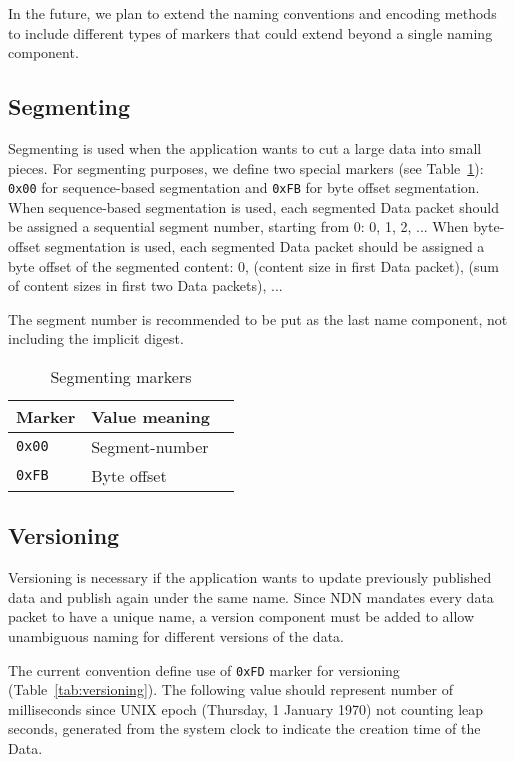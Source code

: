 In the future, we plan to extend the naming conventions and encoding methods to include different types of markers that could extend beyond a single naming component.

\subsection{Segmenting}
\label{sec:segmenting}

Segmenting is used when the application wants to cut a large data into small pieces.
For segmenting purposes, we define two special markers (see Table~\ref{tab:segmenting}): \verb|0x00| for sequence-based segmentation and \verb|0xFB| for byte offset segmentation.
When sequence-based segmentation is used, each segmented Data packet should be assigned a sequential segment number, starting from 0: 0, 1, 2, ...
When byte-offset segmentation is used, each segmented Data packet should be assigned a byte offset of the segmented content: 0, (content size in first Data packet), (sum of content sizes in first two Data packets), ...

The segment number is recommended to be put as the last name component, not including the implicit digest.

\begin{table}[h!]
  \centering
  \caption{Segmenting markers}
  \label{tab:segmenting}
  \begin{tabular}{|l|l|l|}
    \hline
    Marker & Value meaning \\
    \hline \hline
    \verb|0x00| & Segment-number \\
    \verb|0xFB| & Byte offset \\
    \hline
  \end{tabular}
\end{table}

\subsection{Versioning}
\label{sec:version}

Versioning is necessary if the application wants to update previously published data and publish again under the same name.
Since NDN mandates every data packet to have a unique name, a version component must be added to allow unambiguous naming for different versions of the data.

The current convention define use of \verb|0xFD| marker for versioning (Table~\ref{tab:versioning}).
The following value should represent number of milliseconds since UNIX epoch (Thursday, 1 January 1970) not counting leap seconds, generated from the system clock to indicate the creation time of the Data.

